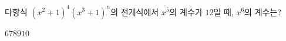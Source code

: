 다항식 $(x^2+1)^4(x^3+1)^n$의 전개식에서 $x^5$의 계수가 $12$일 때, $x^6$의 계수는? 
\begin{choices32}{$6$}{$7$}{$8$}{$9$}{$10$}\end{choices32}
